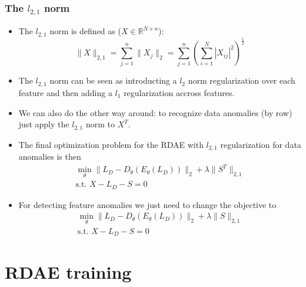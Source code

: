 \documentclass{beamer}
\theoremstyle{plain}
\theoremstyle{definition}
\theoremstyle{remark}
\newcommand{\R}{\mathbb{R}}
\newcommand{\norm}[1]{\lVert#1\rVert}
\begin{document}
\begin{frame}
	\frametitle{The $l_{2,1}$ norm}
	\begin{itemize}
		\item The $l_{2,1}$ norm is defined as ($X\in \R^{N\times n}$):
			\begin{equation}
				\norm{X}_{2,1} = \sum_{j=1}^{n}{\norm{X_j}_{2}} = \sum_{j=1}^{n}{\left(\sum_{i=1}^{N}|X_{ij}|^{2}\right)^{\frac{1}{2}}}
			\end{equation}
		\item The $l_{2,1}$ norm can be seen as introducting a $l_2$ norm regularization over each feature and then adding a $l_1$ regularization accross features.
		\item We can also do the other way around: to recognize data anomalies (by row) just apply the $l_{2,1}$ norm to $X^T$.
	\end{itemize}
\end{frame}

\begin{frame}
	\begin{itemize}
		\item The final optimization problem for the RDAE with $l_{2,1}$ regularization for data anomalies is then
			\begin{align}
				\min_{\theta}{\norm{L_D -D_{\theta}(E_{\theta}(L_D))}_2 + \lambda\norm{S^T}_{2,1}}\\
				\text{s.t. }X-L_D-S=0  
			\end{align}
		\item For detecting feature anomalies we just need to change the objective to
			\begin{align}
				\min_{\theta}{\norm{L_D -D_{\theta}(E_{\theta}(L_D))}_2 + \lambda\norm{S}_{2,1}}\\
				\text{s.t. }X-L_D-S=0  
			\end{align}
	\end{itemize}
\end{frame}

\section{RDAE training}
\end{document}
